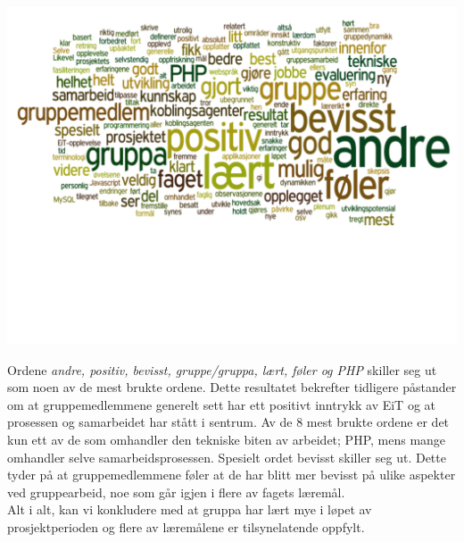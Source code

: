 \begin{center}
\includegraphics[clip=true, width=1 \textwidth,
trim=0cm 5.5cm 0cm 0cm]{ordsky.pdf}
\label{fig:Ordsky}
\end{center}

Ordene \textit{andre, positiv, bevisst, gruppe/gruppa, lært, føler og PHP} skiller seg ut som noen av de mest brukte ordene. Dette resultatet bekrefter tidligere påstander om at gruppemedlemmene generelt sett har ett positivt inntrykk av EiT og at prosessen og samarbeidet har stått i sentrum. Av de 8 mest brukte ordene er det kun ett av de som omhandler den tekniske biten av arbeidet; PHP, mens mange omhandler selve samarbeidsprosessen. Spesielt ordet bevisst skiller seg ut. Dette tyder på at gruppemedlemmene føler at de har blitt mer bevisst på ulike aspekter ved gruppearbeid, noe som går igjen i flere av fagets læremål.\\

Alt i alt, kan vi konkludere med at gruppa har lært mye i løpet av prosjektperioden og flere av læremålene er tilsynelatende oppfylt.\\

